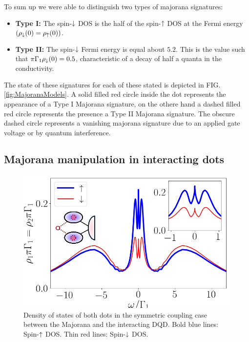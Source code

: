 \documentclass[showpacs,aps,prb,reprint,superscriptaddress]{revtex4-1}
\begin{document}
    To sum up we were able to distinguish two types of majorana signatures:
     \begin{itemize}
         \item \textbf{Type I: }  The spin-$\downarrow$ DOS is the half of the spin-$\uparrow$ DOS  at the Fermi energy $(\rho_\downarrow(0)=\rho_\uparrow(0))$. 
         \item \textbf{Type II: } The spin-$\downarrow$ Fermi energy is equal about $5.2$. This is the value such that  $\pi  \Gamma_1 \rho_\downarrow(0) = 0.5$, characteristic of a decay of half a quanta in the conductivity. 
     \end{itemize}
     The state of these signatures for each of these stated is depicted in FIG.\ref{fig:MajoranaModels}. A solid filled red circle inside the dot represents the appearance of a Type I Majorana signature, on the othere hand a dashed filled red circle represents the presence a  Type II Majorana signature. The obscure dashed circle represents a vanishing majorana signature due to an applied gate voltage or by quantum interference.

 
    \subsection{Majorana manipulation in interacting dots}

\begin{figure}[t]
\begin{center}
\includegraphics[scale=0.4]{Graficos/NRG-t1=t2.png}
\caption{  \label{fig:NRG_Majorana} Density of states of both dots in the symmetric coupling case between the Majorana and the interacting DQD. Bold blue lines: Spin-$\uparrow$ DOS. Thin red lines: Spin-$\downarrow$ DOS.
}
\end{center}
\end{figure}
    
\end{document}
